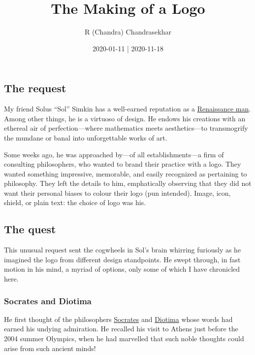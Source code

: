 \documentclass[
  11pt,
  british,
  a4paper,
]{article}
\title{The Making of a Logo}
\author{R (Chandra) Chandrasekhar}
\date{2020-01-11 | 2020-11-18}
\begin{document}
\maketitle

\thispagestyle{empty}


\hypertarget{the-request}{%
\subsection{The request}\label{the-request}}

My friend Solus ``Sol'' Simkin has a well-earned reputation as a
\href{https://www.thefreedictionary.com/renaissance+man}{Renaissance
man}. Among other things, he is a virtuoso of design. He endows his
creations with an ethereal air of perfection---where mathematics meets
aesthetics---to transmogrify the mundane or banal into unforgettable
works of art.

Some weeks ago, he was approached by---of all establishments---a firm of
consulting philosophers, who wanted to brand their practice with a logo.
They wanted something impressive, memorable, and easily recognized as
pertaining to philosophy. They left the details to him, emphatically
observing that they did not want their personal biases to colour their
logo (pun intended). Image, icon, shield, or plain text: the choice of
logo was his.

\hypertarget{the-quest}{%
\subsection{The quest}\label{the-quest}}

This unusual request sent the cogwheels in Sol's brain whirring
furiously as he imagined the logo from different design standpoints. He
swept through, in fast motion in his mind, a myriad of options, only
some of which I have chronicled here.

\hypertarget{socrates-and-diotima}{%
\subsubsection{Socrates and Diotima}\label{socrates-and-diotima}}

He first thought of the philosophers
\href{https://en.wikipedia.org/wiki/Socrates}{Socrates} and
\href{https://en.wikipedia.org/wiki/Diotima_of_Mantinea}{Diotima} whose
words had earned his undying admiration. He recalled his visit to Athens
just before the 2004 summer Olympics, when he had marvelled that such
noble thoughts could arise from such ancient minds!
\end{document}
